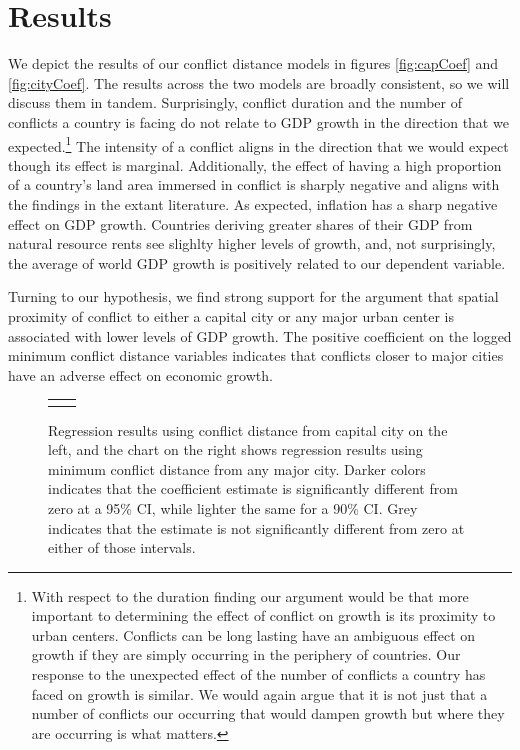 \section{Results}
\label{findings} 

We depict the results of our conflict distance models in figures \ref{fig:capCoef} and \ref{fig:cityCoef}. The results across the two models are broadly consistent, so we will discuss them in tandem. Surprisingly, conflict duration and the number of conflicts a country is facing do not relate to GDP growth in the direction that we expected.\footnote{With respect to the duration finding our argument would be that more important to determining the effect of conflict on growth is its proximity to urban centers. Conflicts can be long lasting have an ambiguous effect on growth if they are simply occurring in the periphery of countries. Our response to the unexpected effect of the number of conflicts a country has faced on growth is similar. We would again argue that it is not just that a number of conflicts our occurring that would dampen growth but where they are occurring is what matters.} The intensity of a conflict aligns in the direction that we would expect though its effect is marginal. Additionally, the effect of having a high proportion of a country's land area immersed in conflict is sharply negative and aligns with the findings in the extant literature. As expected, inflation has a sharp negative effect on GDP growth. Countries deriving greater shares of their GDP from natural resource rents see slighlty higher levels of growth, and, not surprisingly, the average of world GDP growth is positively related to our dependent variable.

Turning to our hypothesis, we find strong support for the argument that spatial proximity of conflict to either a capital city or any major urban center is associated with lower levels of GDP growth. The positive coefficient on the logged minimum conflict distance variables indicates that conflicts closer to major cities have an adverse effect on economic growth. 

\begin{figure}
	\centering
	\begin{tabular}{cc}
		\subfloat[SubFigure 1][Capital City]{
			\resizebox{.45\textwidth}{!}{}
		\label{fig:capCoef}} &
		\subfloat[SubFigure 2][Any Major City]{
			\resizebox{.45\textwidth}{!}{}
		\label{fig:cityCoef}}
	\end{tabular}
	\caption{Regression results using conflict distance from capital city on the left, and the chart on the right shows regression results using minimum conflict distance from any major city. Darker colors indicates that the coefficient estimate is significantly different from zero at a 95\% CI, while lighter the same for a 90\% CI. Grey indicates that the estimate is not significantly different from zero at either of those intervals.}
	\label{fig:coefplot}
\end{figure}

